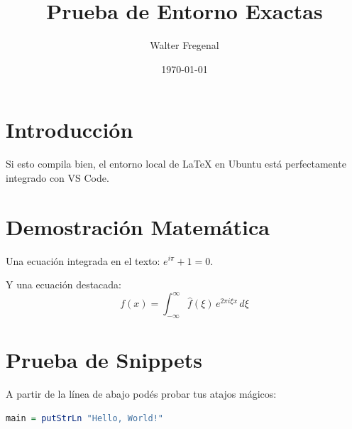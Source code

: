 \documentclass[11pt,a4paper]{article}
\title{Prueba de Entorno Exactas}
\author{Walter Fregenal}
\date{\today}
\begin{document}
\maketitle

\section{Introducción}
Si esto compila bien, el entorno local de \LaTeX{} en Ubuntu está perfectamente integrado con VS Code.

\section{Demostración Matemática}
Una ecuación integrada en el texto: $e^{i\pi} + 1 = 0$.

Y una ecuación destacada:
\begin{equation}
    f(x) = \int_{-\infty}^{\infty} \hat{f}(\xi)\,e^{2\pi i \xi x}\,d\xi
\end{equation}

\section{Prueba de Snippets}
A partir de la línea de abajo podés probar tus atajos mágicos:
\begin{lstlisting}[language=Haskell, caption=${:Descripción}]
main = putStrLn "Hello, World!"
\end{lstlisting}
\end{document}
